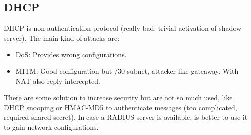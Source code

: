 \documentclass[12pt]{article}
\begin{document}
\subsection{DHCP}
DHCP is non-authentication protocol (really bad, trivial activation of shadow server). The main kind of attacks are:
\begin{itemize}
  \item DoS: Provides wrong configurations.
  \item MITM: Good configuration but /30 subnet, attacker like gateaway. With NAT also reply intercepted.
\end{itemize}
There are some solution to increase security but are not so much used, like DHCP snooping or HMAC-MD5 to authenticate messages (too complicated, required shared secret). In case a RADIUS server is available, is better to use it to gain network configurations.
\end{document}
